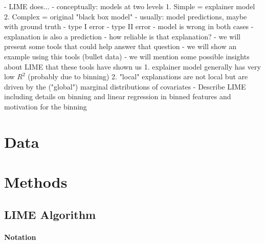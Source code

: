 \documentclass[AMS,STIX1COL]{WileyNJD-v2}
\begin{document}
- LIME does...
  - conceptually: models at two levels
  1. Simple = explainer model
  2. Complex = original "black box model"
- usually: model predictions, maybe with ground truth
  - type I error
  - type II error
  - model is wrong in both cases
- explanation is also a prediction
- how reliable is that explanation?
- we will present some tools that could help answer that question
- we will show an example using this tools (bullet data)
- we will mention some possible insights about LIME that these tools have shown us
1. explainer model generally has very low $R^2$ (probably due to binning)
2. "local" explanations are not local but are driven by the ("global") marginal distributions of covariates 
- Describe LIME including details on binning and linear regression in binned features and motivation for the binning

\section{Data}

\section{Methods}

\subsection{LIME Algorithm}

\paragraph{Notation}
\end{document}
